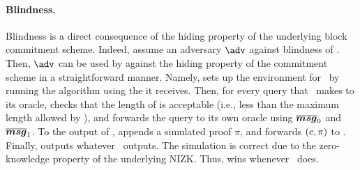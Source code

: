 \paragraph{Blindness.}
Blindness is a direct consequence of the hiding property of the
underlying block commitment scheme. Indeed, assume an adversary $\adv$ against
blindness of \SBCM. Then, $\adv$ can be used by \advB against the hiding
property of the commitment scheme in a straightforward manner. Namely, \advB
sets up the environment for \adv~by running the \KeyGen algorithm using the
\vk it receives. Then, for every query that \adv~makes to its 
oracle, \advB checks that the length of \smsg is acceptable (i.e., less than the
maximum length allowed by \SBCM), and forwards the query to its own 
oracle using $\overline{\boldsymbol{msg}}_0$ and $\overline{\boldsymbol{msg}}_1$. To the output \Ccom of ,
\advB appends a simulated proof $\pi$, and forwards $(c,\pi)$ to \adv.
Finally, \advB outputs whatever \adv~outputs. The simulation is correct due to
the zero-knowledge property of the underlying NIZK. Thus, \advB wins whenever
\adv~does.

